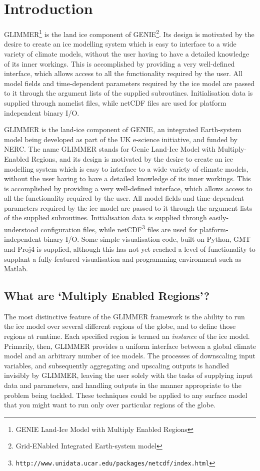 \section{Introduction}

GLIMMER\footnote{GENIE Land-Ice Model with Multiply Enabled Regions} is the land ice component of GENIE\footnote{Grid-ENabled Integrated Earth-system model}. Its design is motivated by the desire to create an ice modelling system which is easy to interface to a wide variety of climate models, without the user having to have a detailed knowledge of its inner workings. This is accomplished by providing a very well-defined interface, which allows access to all the functionality required by the user. All model fields and time-dependent parameters required by the ice model are passed to it through the argument lists of the supplied subroutines. Initialisation data is supplied through namelist files, while netCDF files are used for platform independent binary I/O. 

GLIMMER is the land-ice component of GENIE, an integrated Earth-system model
being developed as part of the UK e-science initiative, and funded by
NERC. The name GLIMMER stands for Genie Land-Ice Model with Multiply-Enabled
Regions, and its design is motivated by the desire to
create an ice modelling system which is easy to interface to a wide variety of
climate models, without the user having to have a detailed knowledge of its
inner workings. This is
accomplished by providing a very well-defined interface, which allows access to
all the functionality required by the user. All model fields and
time-dependent parameters required by the ice model are passed to it through
the argument lists of the supplied subroutines. Initialisation data is
supplied through easily-understood configuration files, while 
netCDF\footnote{\texttt{http://www.unidata.ucar.edu/packages/netcdf/index.html}} 
files are used for platform-independent binary I/O. Some simple visualisation
code, built on Python, GMT and Proj4 is supplied, although this has not yet
reached a level of functionality to supplant a fully-featured visualisation
and programming environment such as Matlab.

\subsection{What are `Multiply Enabled Regions'?}

The most distinctive feature of the GLIMMER framework is the ability to
run the ice model over several different regions of the globe, and to define
those regions at runtime. Each specified region is termed an \emph{instance}
of the ice model. Primarily, then, GLIMMER provides a uniform interface
between a global climate model and an arbitrary number of ice models. The
processes of downscaling input variables, and subsequently aggregating and
upscaling outputs is handled invisibly by GLIMMER, leaving the user solely
with the tasks of supplying input data and parameters, and handling outputs in
the manner appropriate to the problem being tackled. These techniques could be
applied to any surface model that you might want to run only over
particular regions of the globe.

